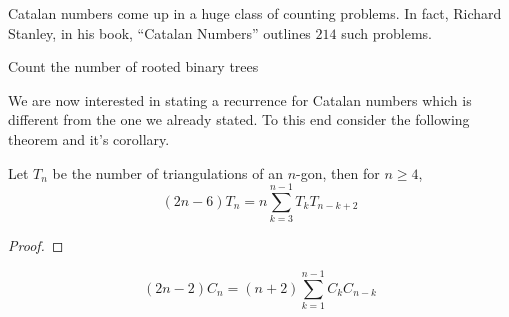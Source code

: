 \begin{remark}
Catalan numbers come up in a huge class of counting problems. In fact, Richard Stanley, in his book, ``Catalan Numbers'' outlines $214$ such problems.  
\end{remark}
\begin{question}
    Count the number of rooted binary trees 
\end{question}
We are now interested in stating a recurrence for Catalan numbers which is different from the one we already stated. To this end consider the following theorem and it's corollary. 
\begin{theorem}
    Let $T_n$ be the number of triangulations of an $n$-gon, then for $n\geq 4$,
    \[
    (2n-6)T_n = n\sum_{k=3}^{n-1}T_kT_{n-k+2}
    \]
\end{theorem}
\begin{proof}
\end{proof}
\begin{corollary}
\[
(2n-2)C_n = (n+2)\sum_{k=1}^{n-1}C_kC_{n-k}
\]
\end{corollary}

\endinput
